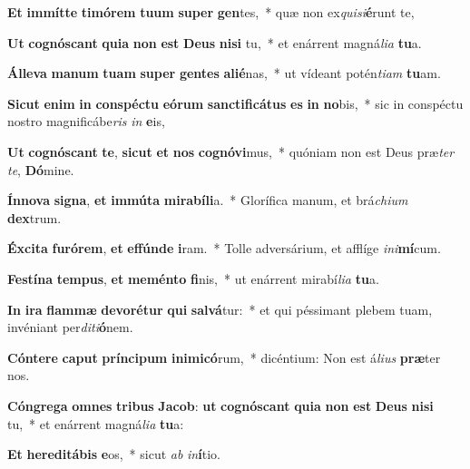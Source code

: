 \item \textbf{Et} \textbf{im}\textbf{mít}\textbf{te} \textbf{ti}\textbf{mó}\textbf{rem} \textbf{tu}\textbf{um} \textbf{su}\textbf{per} \textbf{gen}tes,~* quæ non ex\textit{qui}\textit{si}\textbf{é}runt te,
\item \textbf{Ut} \textbf{co}\textbf{gnós}\textbf{cant} \textbf{qui}\textbf{a} \textbf{non} \textbf{est} \textbf{De}\textbf{us} \textbf{ni}\textbf{si} tu,~* et enárrent magná\textit{li}\textit{a} \textbf{tu}a.
\item \textbf{Ál}\textbf{le}\textbf{va} \textbf{ma}\textbf{num} \textbf{tu}\textbf{am} \textbf{su}\textbf{per} \textbf{gen}\textbf{tes} \textbf{a}\textbf{li}\textbf{é}nas,~* ut vídeant potén\textit{ti}\textit{am} \textbf{tu}am.
\item \textbf{Sic}\textbf{ut} \textbf{e}\textbf{nim} \textbf{in} \textbf{con}\textbf{spéc}\textbf{tu} \textbf{e}\textbf{ó}\textbf{rum} \textbf{sanc}\textbf{ti}\textbf{fi}\textbf{cá}\textbf{tus} \textbf{es} \textbf{in} \textbf{no}bis,~* sic in conspéctu nostro magnificábe\textit{ris} \textit{in} \textbf{e}is,
\item \textbf{Ut} \textbf{co}\textbf{gnós}\textbf{cant} \textbf{te}, \textbf{sic}\textbf{ut} \textbf{et} \textbf{nos} \textbf{co}\textbf{gnó}\textbf{vi}mus,~* quóniam non est Deus præ\textit{ter} \textit{te}, \textbf{Dó}mine.
\item \textbf{Ín}\textbf{no}\textbf{va} \textbf{si}\textbf{gna}, \textbf{et} \textbf{im}\textbf{mú}\textbf{ta} \textbf{mi}\textbf{ra}\textbf{bí}\textbf{li}a.~* Glorífica manum, et brá\textit{chi}\textit{um} \textbf{dex}trum.
\item \textbf{Éx}\textbf{ci}\textbf{ta} \textbf{fu}\textbf{ró}\textbf{rem}, \textbf{et} \textbf{ef}\textbf{fún}\textbf{de} \textbf{i}ram.~* Tolle adversárium, et afflíge \textit{in}\textit{i}\textbf{mí}cum.
\item \textbf{Fes}\textbf{tí}\textbf{na} \textbf{tem}\textbf{pus}, \textbf{et} \textbf{me}\textbf{mén}\textbf{to} \textbf{fi}nis,~* ut enárrent mirabí\textit{li}\textit{a} \textbf{tu}a.
\item \textbf{In} \textbf{i}\textbf{ra} \textbf{flam}\textbf{mæ} \textbf{de}\textbf{vo}\textbf{ré}\textbf{tur} \textbf{qui} \textbf{sal}\textbf{vá}tur:~* et qui péssimant plebem tuam, invéniant per\textit{di}\textit{ti}\textbf{ó}nem.
\item \textbf{Cón}\textbf{te}\textbf{re} \textbf{ca}\textbf{put} \textbf{prín}\textbf{ci}\textbf{pum} \textbf{in}\textbf{i}\textbf{mi}\textbf{có}rum,~* dicéntium: Non est á\textit{li}\textit{us} \textbf{præ}ter nos.
\item \textbf{Cón}\textbf{gre}\textbf{ga} \textbf{om}\textbf{nes} \textbf{tri}\textbf{bus} \textbf{Ja}\textbf{cob}: \textbf{ut} \textbf{co}\textbf{gnós}\textbf{cant} \textbf{qui}\textbf{a} \textbf{non} \textbf{est} \textbf{De}\textbf{us} \textbf{ni}\textbf{si} tu,~* et enárrent magná\textit{li}\textit{a} \textbf{tu}a:
\item \textbf{Et} \textbf{he}\textbf{re}\textbf{di}\textbf{tá}\textbf{bis} \textbf{e}os,~* sicut \textit{ab} \textit{in}\textbf{í}tio.
